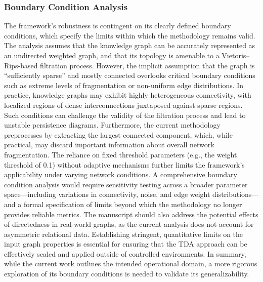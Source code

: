 \documentclass[12pt]{article}
\begin{document}
\subsubsection{Boundary Condition Analysis  }
The framework’s robustness is contingent on its clearly defined boundary conditions, which specify the limits within which the methodology remains valid. The analysis assumes that the knowledge graph can be accurately represented as an undirected weighted graph, and that its topology is amenable to a Vietoris–Rips-based filtration process. However, the implicit assumption that the graph is “sufficiently sparse” and mostly connected overlooks critical boundary conditions such as extreme levels of fragmentation or non-uniform edge distributions. In practice, knowledge graphs may exhibit highly heterogeneous connectivity, with localized regions of dense interconnections juxtaposed against sparse regions. Such conditions can challenge the validity of the filtration process and lead to unstable persistence diagrams. Furthermore, the current methodology preprocesses by extracting the largest connected component, which, while practical, may discard important information about overall network fragmentation. The reliance on fixed threshold parameters (e.g., the weight threshold of 0.1) without adaptive mechanisms further limits the framework’s applicability under varying network conditions. A comprehensive boundary condition analysis would require sensitivity testing across a broader parameter space—including variations in connectivity, noise, and edge weight distributions—and a formal specification of limits beyond which the methodology no longer provides reliable metrics. The manuscript should also address the potential effects of directedness in real-world graphs, as the current analysis does not account for asymmetric relational data. Establishing stringent, quantitative limits on the input graph properties is essential for ensuring that the TDA approach can be effectively scaled and applied outside of controlled environments. In summary, while the current work outlines the intended operational domain, a more rigorous exploration of its boundary conditions is needed to validate its generalizability.
\end{document}
